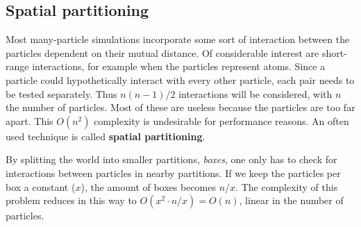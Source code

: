 \subsection{Spatial partitioning}

Most many-particle simulations incorporate some sort of interaction between the 
particles dependent on their mutual distance. Of considerable interest are 
short-range interactions, for example when the particles represent atoms. Since 
a particle could hypothetically interact with every other particle, each pair 
needs to be tested separately. Thus $n(n-1)/2$ interactions will be considered, 
with $n$ the number of particles. Most of these are useless because the 
particles are too far apart. This $O(n^2)$ complexity is undesirable for 
performance reasons. An often used technique is called \textbf{spatial 
partitioning}.

By splitting the world into smaller partitions, \emph{boxes}, one only has to 
check for interactions between particles in nearby partitions. If we keep the 
particles per box a constant ($x$), the amount of boxes becomes $n/x$. The 
complexity of this problem reduces in this way to $O(x^2 \cdot n/x) = O(n)$, 
linear in the number of particles.
